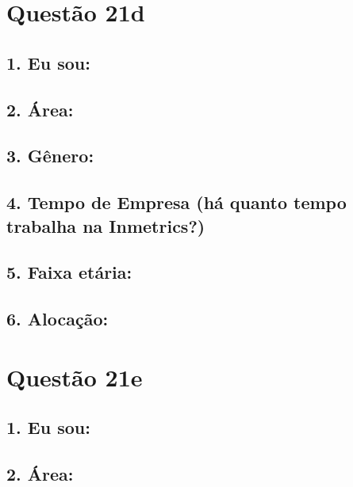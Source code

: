 \documentclass[]{book}
\begin{document}
\hypertarget{questao-21d}{%
\section{Questão 21d}\label{questao-21d}}

\hypertarget{eu-sou-64}{%
\subsection{1. Eu sou:}\label{eu-sou-64}}

\hypertarget{area-64}{%
\subsection{2. Área:}\label{area-64}}

\hypertarget{genero-64}{%
\subsection{3. Gênero:}\label{genero-64}}

\hypertarget{tempo-de-empresa-ha-quanto-tempo-trabalha-na-inmetrics-64}{%
\subsection{4. Tempo de Empresa (há quanto tempo trabalha na Inmetrics?)}\label{tempo-de-empresa-ha-quanto-tempo-trabalha-na-inmetrics-64}}

\hypertarget{faixa-etaria-64}{%
\subsection{5. Faixa etária:}\label{faixa-etaria-64}}

\hypertarget{alocacao-64}{%
\subsection{6. Alocação:}\label{alocacao-64}}

\hypertarget{questao-21e}{%
\section{Questão 21e}\label{questao-21e}}

\hypertarget{eu-sou-65}{%
\subsection{1. Eu sou:}\label{eu-sou-65}}

\hypertarget{area-65}{%
\subsection{2. Área:}\label{area-65}}
\end{document}
